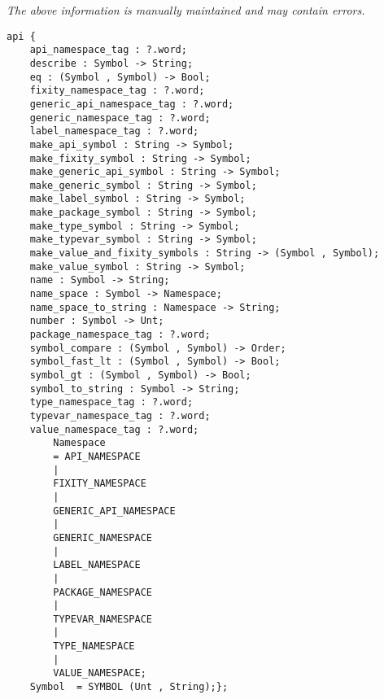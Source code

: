 \label{pkg:symbol}

{\tiny \it The above information is manually maintained and may contain errors.}
\begin{verbatim}
api {
    api_namespace_tag : ?.word;
    describe : Symbol -> String;
    eq : (Symbol , Symbol) -> Bool;
    fixity_namespace_tag : ?.word;
    generic_api_namespace_tag : ?.word;
    generic_namespace_tag : ?.word;
    label_namespace_tag : ?.word;
    make_api_symbol : String -> Symbol;
    make_fixity_symbol : String -> Symbol;
    make_generic_api_symbol : String -> Symbol;
    make_generic_symbol : String -> Symbol;
    make_label_symbol : String -> Symbol;
    make_package_symbol : String -> Symbol;
    make_type_symbol : String -> Symbol;
    make_typevar_symbol : String -> Symbol;
    make_value_and_fixity_symbols : String -> (Symbol , Symbol);
    make_value_symbol : String -> Symbol;
    name : Symbol -> String;
    name_space : Symbol -> Namespace;
    name_space_to_string : Namespace -> String;
    number : Symbol -> Unt;
    package_namespace_tag : ?.word;
    symbol_compare : (Symbol , Symbol) -> Order;
    symbol_fast_lt : (Symbol , Symbol) -> Bool;
    symbol_gt : (Symbol , Symbol) -> Bool;
    symbol_to_string : Symbol -> String;
    type_namespace_tag : ?.word;
    typevar_namespace_tag : ?.word;
    value_namespace_tag : ?.word;
        Namespace
        = API_NAMESPACE
        |
        FIXITY_NAMESPACE
        |
        GENERIC_API_NAMESPACE
        |
        GENERIC_NAMESPACE
        |
        LABEL_NAMESPACE
        |
        PACKAGE_NAMESPACE
        |
        TYPEVAR_NAMESPACE
        |
        TYPE_NAMESPACE
        |
        VALUE_NAMESPACE;
    Symbol  = SYMBOL (Unt , String);};
\end{verbatim}
